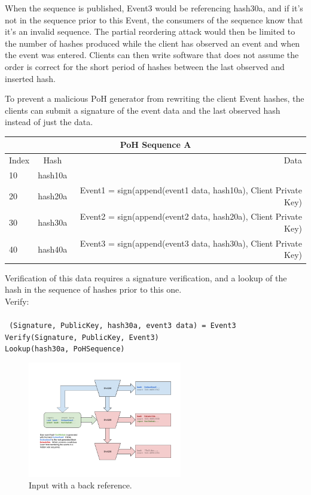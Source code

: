 \documentclass[12pt]{article}
\begin{document}
When the sequence is published, Event3 would be referencing hash30a, and if it’s not in the sequence prior to this Event, the consumers of the sequence know that it’s an invalid sequence. The partial reordering attack would then be limited to the number of hashes produced while the client has observed an event and when the event was entered. Clients can then write software that does not assume the order is correct for the short period of hashes between the last observed and inserted hash.

To prevent a malicious PoH generator from rewriting the client Event hashes, the clients can submit a signature of the event data and the last observed hash instead of just the data.\\
\begin{center}
  \begin{tabular}{ | l | c | r |}
    \hline
    \multicolumn{3}{|c|}{PoH Sequence A} \\
    \hline
    Index & Hash & Data \\ \hline
    10 & hash10a & \\ \hline
    20 & hash20a & Event1 = sign(append(event1 data, hash10a), Client Private Key) \\ \hline
    30 & hash30a & Event2 = sign(append(event2 data, hash20a), Client Private Key) \\ \hline
    40 & hash40a & Event3 = sign(append(event3 data, hash30a), Client Private Key) \\
    \hline
    \end{tabular}
\end{center}

Verification of this data requires a signature verification, and a lookup of the hash in the sequence of hashes prior to this one.\\
\noindent Verify:\\\\\noindent
\texttt{
    (Signature, PublicKey, hash30a, event3 data) = Event3 \\
    Verify(Signature, PublicKey, Event3)\\
    Lookup(hash30a, PoHSequence)
}

\begin{figure}
  \begin{center}
    \centering
    \includegraphics[width=0.6\textwidth]{figures/fig_6.png}
    \caption[Fig 6]{Input with a back reference.\label{fig:poh_consistency}}
  \end{center}
  \end{figure}
\end{document}
